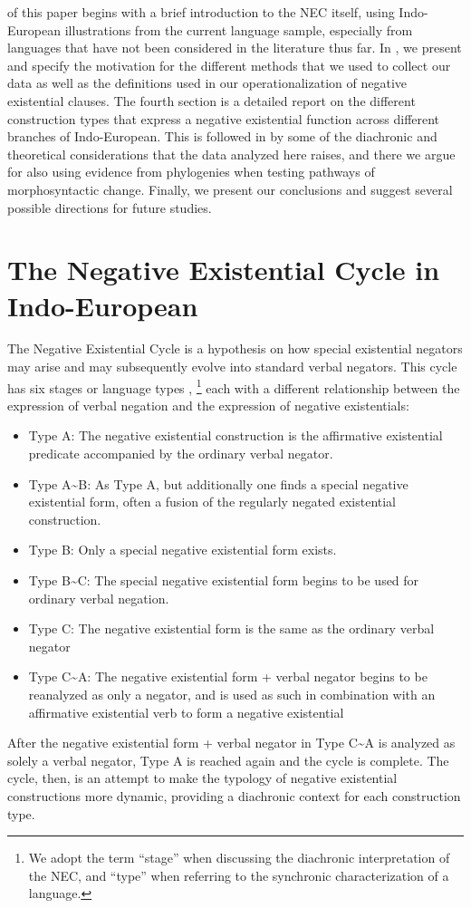 \documentclass[output=paper]{langsci/langscibook}
\begin{document}
 of this paper begins with a brief introduction to the
NEC itself, using Indo-European illustrations from the current language
sample, especially from languages that have not been considered in the
literature thus far. In , we present and specify the
motivation for the different methods that we used to collect our data as
well as the definitions used in our operationalization of negative
existential clauses. The fourth section is a detailed report on the
different construction types that express a negative existential function
across different branches of Indo-European. This is followed in
 by some of the diachronic and theoretical
considerations that the data analyzed here raises, and there we argue for
also using evidence from phylogenies when testing pathways of
morphosyntactic change. Finally, we present our conclusions and suggest
several possible directions for future studies.

\section{The Negative Existential Cycle in Indo-European}\label{sec:ieur-2}

The Negative Existential Cycle \citep{Croft1991} is a hypothesis on how
special existential negators may arise and may subsequently evolve into
standard verbal negators. This cycle has six stages \citep{Veselinova2014}
or language types \citep{Croft1991},%
%
    \footnote{We adopt the term ``stage'' when
    discussing the diachronic interpretation of the NEC, and ``type'' when
    referring to the synchronic characterization of a language.}
%
each with a
different relationship between the expression of verbal negation and the
expression of negative existentials:
%
\begin{itemize}
\item Type A: The negative existential construction is the affirmative existential predicate accompanied by the ordinary verbal negator.
\item Type A{\textasciitilde}B: As Type A, but additionally one finds a special negative existential form, often a fusion of the regularly negated existential construction.
\item Type B: Only a special negative existential form exists.
\item Type B{\textasciitilde}C: The special negative existential form begins to be used for ordinary verbal negation.
\item Type C: The negative existential form is the same as the ordinary verbal negator
\item Type C{\textasciitilde}A: The negative existential form + verbal negator begins to be reanalyzed as only a negator, and is used as such in combination with an affirmative existential verb to form a negative existential
\end{itemize}
%
After the negative existential form + verbal negator in Type C{\textasciitilde}A is analyzed as solely a verbal negator, Type A is reached again and the cycle is complete. The cycle, then, is an attempt to make the typology of negative existential constructions more dynamic, providing a diachronic context for each construction type.
\end{document}
